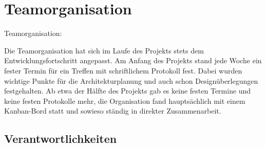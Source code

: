 \documentclass[
   draft=false
  ,paper=a4
  ,twoside=true
  ,fontsize=11pt
  ,headsepline
  ,DIV11
  ,parskip=full+
]{scrartcl} %
\begin{document}
\setcounter{page}{1}
\flushleft


\tableofcontents
\newpage



\section{Teamorganisation}
Teamorganisation:

Die Teamorganisation hat sich im Laufe des Projekts stets dem Entwicklungsfortschritt angepasst.\newline 
Am Anfang des Projekts stand jede Woche ein fester Termin für ein Treffen mit schriftlichem Protokoll fest. Dabei wurden wichtige Punkte für die Architekturplanung und auch schon Designüberlegungen festgehalten. \newline
Ab etwa der Hälfte des Projekts gab es keine festen Termine und keine festen Protokolle mehr, die Organisation fand hauptsächlich mit einem Kanban-Bord statt und sowieso ständig in direkter Zusammenarbeit.

\subsection{Verantwortlichkeiten}
 
\end{document}
